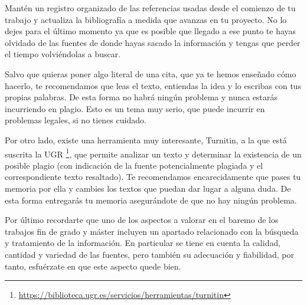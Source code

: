 Mantén un registro organizado de las referencias usadas desde el comienzo de tu trabajo y actualiza la bibliografía a medida que avanzas en tu proyecto. No lo dejes para el último momento ya que es posible que llegado a ese punto te hayas olvidado de las fuentes de donde hayas sacado la información y tengas que perder el tiempo volviéndolas a buscar.

Salvo que quieras poner algo literal de una cita, que ya te hemos enseñado cómo hacerlo, te recomendamos que leas el texto, entiendas la idea y lo escribas con tus propias palabras. De esta forma no habrá ningún problema y nunca estarás incurriendo en plagio. Esto es un tema muy serio, que puede incurrir en problemas legales, si no tienes cuidado. 

Por otro lado, existe una herramienta muy interesante, Turnitin, a la que está suscrita la UGR \footnote{\url{https://biblioteca.ugr.es/servicios/herramientas/turnitin}}, que permite analizar un texto y determinar la existencia de un posible plagio (con indicación de la fuente potencialmente plagiada y el correspondiente texto resaltado). Te recomendamos encarecidamente que pases tu memoria por ella y cambies los textos que puedan dar lugar a alguna duda. De esta forma entregarás tu memoria asegurándote de que no hay ningún problema.

Por último recordarte que uno de los aspectos a valorar en el baremo de los trabajos fin de grado y máster incluyen un apartado relacionado con la búsqueda y tratamiento de la información. En particular se tiene en cuenta la calidad, cantidad y variedad de las fuentes, pero también su adecuación y fiabilidad, por tanto, esfuérzate en que este aspecto quede bien.
